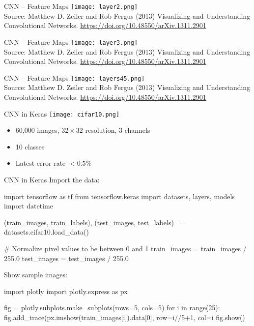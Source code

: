 \documentclass[ignorenonframetext,xcolor=x11names]{beamer}
\begin{document}
\begin{frame}{CNN -- Feature Maps}
\centering
\texttt{[image: layer2.png]} \\
\vspace{\baselineskip}
\scriptsize Source: Matthew D. Zeiler and Rob Fergus (2013) Visualizing and Understanding Convolutional Networks. \url{https://doi.org/10.48550/arXiv.1311.2901}
\end{frame}

\begin{frame}{CNN -- Feature Maps}
\centering
\texttt{[image: layer3.png]} \\
\vspace{\baselineskip}
\scriptsize Source: Matthew D. Zeiler and Rob Fergus (2013) Visualizing and Understanding Convolutional Networks. \url{https://doi.org/10.48550/arXiv.1311.2901}
\end{frame}

\begin{frame}{CNN -- Feature Maps}
\centering
\texttt{[image: layers45.png]} \\
\vspace{0.5\baselineskip}
\scriptsize Source: Matthew D. Zeiler and Rob Fergus (2013) Visualizing and Understanding Convolutional Networks. \url{https://doi.org/10.48550/arXiv.1311.2901}
\end{frame}

\begin{frame}{CNN in Keras}
\centering
\texttt{[image: cifar10.png]}
\begin{itemize}
   \item 60,000 images, $32 \times 32$ resolution, 3 channels
   \item 10 classes
   \item Latest error rate $< 0.5\%$
\end{itemize}
\end{frame}

\begin{frame}[fragile]{CNN in Keras}
Import the data:
\begin{pythoncode}
import tensorflow as tf
from tensorflow.keras import datasets, layers, models
import datetime

(train_images, train_labels), (test_images, test_labels) \
    = datasets.cifar10.load_data()

# Normalize pixel values to be between 0 and 1
train_images = train_images / 255.0
test_images = test_images / 255.0
\end{pythoncode}
Show sample images:
\begin{pythoncode}
import plotly
import plotly.express as px

fig = plotly.subplots.make_subplots(rows=5, cols=5)
for i in range(25):
    fig.add_trace(px.imshow(train_images[i]).data[0], 
                            row=i//5+1, col=i%
fig.show()
\end{pythoncode}
\end{frame}
\end{document}
